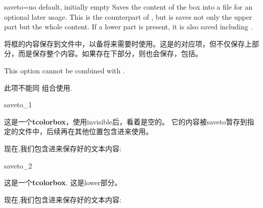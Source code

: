 \begin{docTcbKey}[][doc new=2015-05-04]{saveto}{=}{no default, initially empty}
Saves the content of the box into a file for an optional later usage.
This is the counterpart of , but is saves not
only the upper part but the whole content. If a lower part is present,
it is also saved including .


将框的内容保存到文件中，以备将来需要时使用。这是的对应项，但不仅保存上部分，而是保存整个内容。如果存在下部分，则也会保存，包括。

\begin{marker}
This option cannot be combined with .

此项不能同  组合使用.
\end{marker}

\begin{exdispExample}{saveto_1}
\begin{tcolorbox}[invisible%
,saveto=\jobname_mysave1.tex
,colback=white]
这是一个\textbf{tcolorbox}，使用invisible后，看着是空的。
它的内容被saveto暂存到指定的文件中，后续再在其他位置包含进来使用。
\end{tcolorbox}

现在,我们包含进来保存好的文本内容:\\

\end{exdispExample}

\begin{exdispExample}{saveto_2}
\begin{tcolorbox}[saveto=\jobname_mysave2.tex]
这是一个\textbf{tcolorbox}.
\tcblower
这是lower部分。
\end{tcolorbox}

现在,我们包含进来保存好的文本内容:
\begin{tcolorbox}[colframe=red,colback=red!10,
coltitle=black,colbacktitle=red!20
,sidebyside%
,title=在这里我们看到保存的内容包括lower部分]

\end{tcolorbox}
\end{exdispExample}
\end{docTcbKey}


